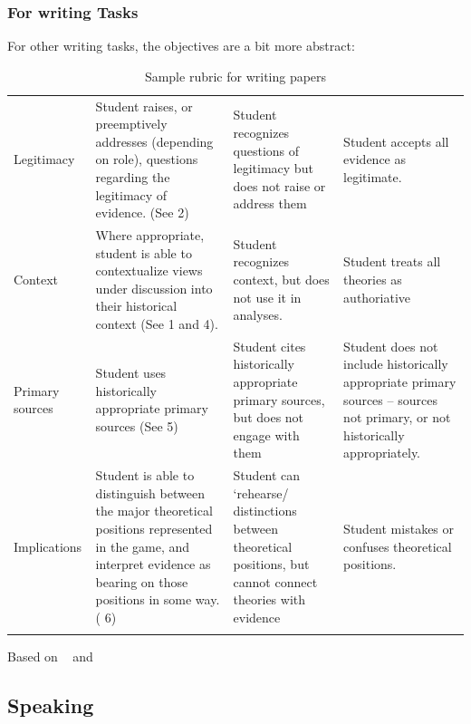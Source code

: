 \begin{refsection}
\subsubsection{For writing Tasks}
\label{forwritingtasks}

For other writing tasks, the objectives are a bit more abstract:

 \begin{longtable}[!t]{ | P{2cm} | P{5cm} | P{3.5cm} | P{3.5cm} |}
\hline
{} &  &  &  \\ \hline

Legitimacy&Student raises, or preemptively addresses (depending on role), questions  regarding the legitimacy of evidence. (See  2) & Student recognizes questions of legitimacy but does not raise or address them & Student accepts all evidence as legitimate. \\ \hline

Context&Where appropriate, student is able to contextualize views under discussion into their historical context (See  1 and 4). & Student recognizes context, but does not use it in analyses. & Student treats all theories as authoriative\\ \hline

Primary sources&Student uses historically appropriate primary sources (See  5) & Student cites historically appropriate primary sources, but does not engage with them & Student does not include historically appropriate primary sources -- sources not primary, or not historically appropriately. \\ \hline

Implications&Student is able to distinguish between the major theoretical positions represented in the game, and interpret evidence as bearing on those positions in some way. ( 6) & Student can ‘rehearse/ distinctions between theoretical positions, but cannot connect theories with evidence& Student mistakes or confuses theoretical positions.\\ \hline
\caption{Sample rubric for writing papers}
\label{table: speakingrubric}
\end{longtable}


Based on ~\citep{Clabough:uw} and ~\citep{Dawn:wh}

\subsection{Speaking}
\label{speaking}


\end{refsection}
